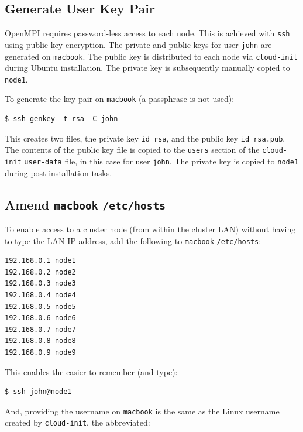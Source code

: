 \documentclass{report}
\begin{document}
%
%
\subsection{Generate User Key Pair}

OpenMPI requires password-less access to each node. This is achieved with \verb|ssh| using public-key encryption. The private and public keys for user \verb|john| are generated on \verb|macbook|. The public key is distributed to each node via \verb|cloud-init| during Ubuntu installation. The private key is subsequently manually copied to \verb|node1|.

To generate the key pair on \verb|macbook| (a passphrase is not used):

\lstset{style=type}
\begin{lstlisting}[]
$ ssh-genkey -t rsa -C john
\end{lstlisting}

This creates two files, the private key \verb|id_rsa|, and the public key \verb|id_rsa.pub|. The contents of the public key file is copied to the \verb|users| section of the \verb|cloud-init| \verb|user-data| file, in this case for user \verb|john|. The private key is copied to \verb|node1| during post-installation tasks.


\subsection{Amend \texttt{macbook} \texttt{/etc/hosts}}

To enable access to a cluster node (from within the cluster LAN) without having to type the LAN IP address, add the following to \verb|macbook| \verb|/etc/hosts|:

\lstset{style=listing}
\begin{lstlisting}[numbers=none, caption=/etc/hosts]
192.168.0.1 node1
192.168.0.2 node2
192.168.0.3 node3
192.168.0.4 node4
192.168.0.5 node5
192.168.0.6 node6
192.168.0.7 node7
192.168.0.8 node8
192.168.0.9 node9
\end{lstlisting}

This enables the easier to remember (and type):

\lstset{style=type}
\begin{lstlisting}[]
$ ssh john@node1
\end{lstlisting}

And, providing the username on \verb|macbook| is the same as the Linux username created by \verb|cloud-init|,
the abbreviated:
\end{document}
